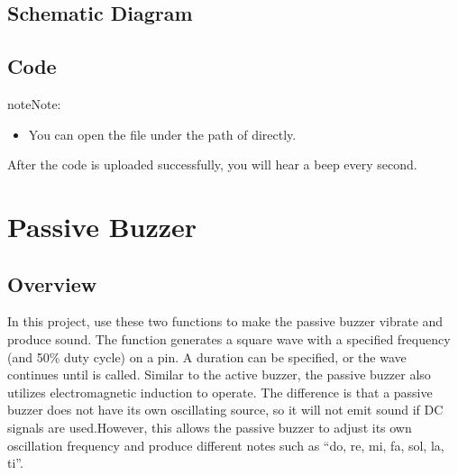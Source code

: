\documentclass[a4paper,11pt,english]{sphinxmanual}
\begin{document}


\subsection{Schematic Diagram}
\label{\detokenize{Basic_Project/Active_Buzzer:schematic-diagram}}


\subsection{Code}
\label{\detokenize{Basic_Project/Active_Buzzer:code}}
\begin{sphinxadmonition}{note}{Note:}\begin{itemize}
\item {} 
\sphinxAtStartPar
You can open the file  under the path of  directly.

\end{itemize}
\end{sphinxadmonition}

\sphinxAtStartPar
After the code is uploaded successfully, you will hear a beep every second.

\sphinxstepscope


\section{Passive Buzzer}
\label{\detokenize{Basic_Project/Passive_Buzzer:passive-buzzer}}\label{\detokenize{Basic_Project/Passive_Buzzer:basic-passive-buzzer}}\label{\detokenize{Basic_Project/Passive_Buzzer::doc}}

\subsection{Overview}
\label{\detokenize{Basic_Project/Passive_Buzzer:overview}}
\sphinxAtStartPar
In this project, use these two functions to make the passive buzzer vibrate and produce sound. The function  generates a square wave with a specified frequency (and 50\% duty cycle) on a pin. A duration can be specified, or the wave continues until  is called.
Similar to the active buzzer, the passive buzzer also utilizes electromagnetic induction to operate.
The difference is that a passive buzzer does not have its own oscillating source, so it will not emit sound if DC signals are used.However, this allows the passive buzzer to adjust its own oscillation frequency and produce different notes such as “do, re, mi, fa, sol, la, ti”.
\end{document}
